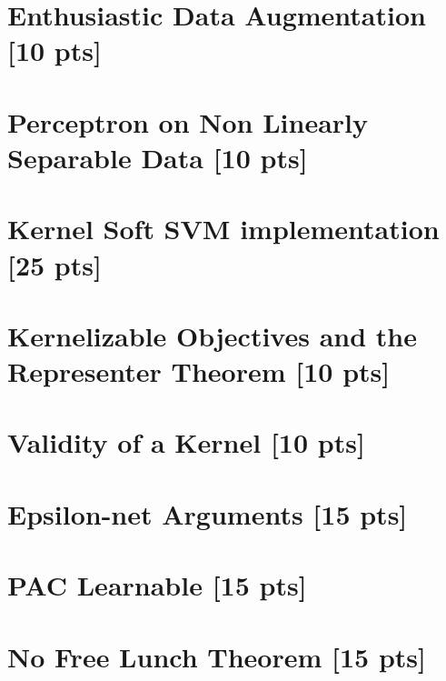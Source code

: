 \documentclass[letterpaper,12pt,addpoints]{exam}
\begin{document}
\newpage
\begin{questions}
\question[10]
\section*{Enthusiastic Data Augmentation [10 pts]}

\addpoints

\newpage
\question
\section*{Perceptron on Non Linearly Separable Data [10 pts]}


\newpage
\question
\section*{Kernel Soft SVM implementation [25 pts]}


\newpage
\question[10]
\section*{Kernelizable Objectives and  the Representer Theorem [10 pts] }

\addpoints

\newpage
\question[10]
\section*{Validity of a Kernel [10 pts]}

\addpoints

\newpage
\question[15]
\section*{Epsilon-net Arguments [15 pts]}

\addpoints

\newpage
\question[15]
\section*{PAC Learnable [15 pts]}

\addpoints

\newpage
\question
\section*{No Free Lunch Theorem [15 pts]}


\end{questions}
\end{document}
